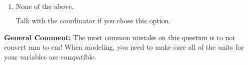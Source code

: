 \documentclass{extbook}[14pt]
\begin{document}
\begin{enumerate}
{\begin{enumerate}[label=\Alph*.]
This option uses the model $R = kl^{3}$ as if this is a direct variation.
\item \( \text{None of the above.} \)

Talk with the coordinator if you chose this option.
\end{enumerate}

\textbf{General Comment:} The most common mistake on this question is to not convert mm to cm! When modeling, you need to make sure all of the units for your variables are compatible.
}
\end{enumerate}
\end{document}
